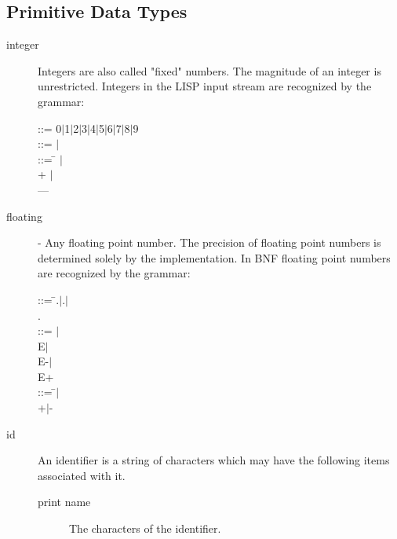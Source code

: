 \subsection{Primitive Data Types}
\label{pdat}
\begin{description}
\item[integer] Integers are also called "fixed" numbers. The magnitude of
an integer is unrestricted. Integers in the LISP input stream are
 
recognized by the grammar:

\begin{tabbing}
 ::= 0$\mid$1$\mid$2$\mid$3$\mid$4$\mid$5$\mid$6$\mid$7$\mid$8$\mid$9
\\
 ::= $\mid$ \\
 ::= \=  $\mid$ \\
\> + $\mid$ \\
\> ---
\end{tabbing}

\item[floating] - Any floating point number. The precision of floating point
numbers is determined solely by the implementation. In BNF floating
point numbers are recognized by the grammar:

\begin{tabbing}
 ::=  \= .$\mid$.$\mid$ \\
\> . \\
\>  ::= $\mid$ \\
\> E$\mid$ \\
\> E-$\mid$ \\
\> E+ \\
 ::= \= $\mid$ \\
\> +$\mid$-
\end{tabbing}

\item[id] An identifier is a string of characters which may have the
 
following items associated with it.

\begin{description}
\item[print name]  The characters of the identifier.


\end{description}
\end{description}
